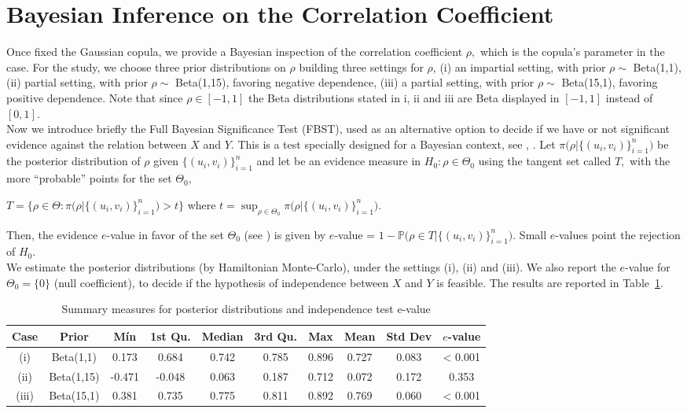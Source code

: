 \documentclass{aip-cp}
\begin{document}
\section{Bayesian Inference on the Correlation Coefficient}\label{bayesian}
Once fixed the Gaussian copula, we provide a Bayesian inspection of the correlation coefficient $\rho,$ which is the copula's parameter in the case.  For the study, we choose three prior distributions on $\rho$ building three settings for $\rho$, (i) an impartial setting, with prior $\rho \sim$ Beta(1,1), (ii) partial setting, with prior $\rho \sim$ Beta(1,15), favoring negative dependence, (iii) a partial setting, with prior $\rho \sim$ Beta(15,1), favoring positive dependence.
Note that since $\rho \in [-1,1]$ the Beta distributions stated in i, ii and iii are Beta displayed in $[-1,1]$ instead of $[0,1].$\\
Now we introduce briefly the Full Bayesian Significance Test (FBST), used as an alternative option to decide if we have or not significant evidence against the relation between $X$ and $Y.$ This is a test specially designed for a Bayesian context, see \cite{pereira}, \cite{madruga}. Let $\pi\Big(\rho \vert \{(u_i,v_i)\}_{i=1}^n\Big)$ be the 
posterior distribution of $\rho$ given $\{(u_i,v_i)\}_{i=1}^n$ and let be an evidence measure in $H_0: \rho \in \Theta_0$ using the tangent set called $T,$
with the more ``probable'' points for the set $\Theta_0 ,$
\begin{center}
 $T = \Big\{\rho \in \Theta: \pi\Big(\rho| \{(u_i,v_i)\}_{i=1}^n\Big) > t\Big\}$ where $t = \sup_{\rho \in \Theta_0}\pi\Big(\rho\vert \{(u_i,v_i)\}_{i=1}^n \Big).$ 
\end{center}
Then, the evidence $e$-value in favor of the set $\Theta_0$ (see \cite{pereira}) is given by
$e$-value = $1 - \mathbb{P}\Big(\rho \in T| \{(u_i,v_i)\}_{i=1}^n \Big).$
Small $e$-values point the rejection of $H_0.$\\
We estimate the posterior distributions (by Hamiltonian Monte-Carlo), under the settings (i), (ii) and (iii). We also report the $e$-value for $\Theta_0=\{0\}$ (null coefficient), to decide if the hypothesis of independence between $X$ and $Y$ is feasible.  The results are reported in Table~\ref{tabla2}. 
\begin{center}
\begin{table}[h!]
\label{tabla2}
\caption{Summary measures for posterior distributions and independence test e-value}
\centering
\begin{tabular}{c|c|c|c|c|c|c|c|c|c}
Case&Prior & Mín & 1st Qu. & Median & 3rd Qu. & Max & Mean & Std Dev & $e$-value \\
\hline 
(i)&Beta(1,1) & 0.173 & 0.684 & 0.742 & 0.785 & 0.896 & 0.727 & 0.083 & < 0.001\\
(ii)&Beta(1,15) & -0.471 & -0.048 & 0.063 & 0.187 & 0.712 & 0.072 & 0.172 & 0.353 \\
(iii)&Beta(15,1) & 0.381 & 0.735 & 0.775 & 0.811 & 0.892 & 0.769 & 0.060 & < 0.001
\end{tabular}
\end{table}
\end{center}
\end{document}
